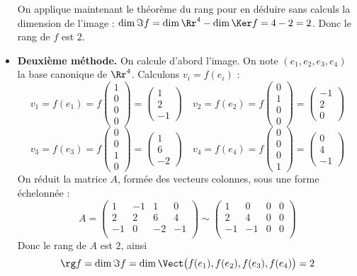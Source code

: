 \documentclass[class=report,crop=false]{standalone}
\begin{document}
\begin{exemple}
\begin{itemize}
  On applique maintenant le théorème du rang pour en déduire sans calculs la dimension de l'image :
  $\dim \Im f = \dim \Rr^4 - \dim \Ker f = 4-2 = 2$.
  Donc le rang de $f$ est $2$.

  \item \textbf{Deuxième méthode.} On calcule d'abord l'image.
  On note $(e_1,e_2,e_3,e_4)$ la base canonique de $\Rr^4$.
Calculons $v_i = f(e_i)$ :
$$v_1 = f(e_1) = f\left(\begin{smallmatrix} 1 \\ 0 \\ 0 \\0 \end{smallmatrix}\right)
= \left(\begin{smallmatrix} 1 \\ 2 \\ -1 \end{smallmatrix}\right) \quad
v_2 = f(e_2) = f\left(\begin{smallmatrix} 0 \\ 1 \\ 0 \\ 0\end{smallmatrix}\right)
= \left(\begin{smallmatrix} -1 \\ 2 \\ 0 \end{smallmatrix}\right)$$
$$
v_3 = f(e_3) = f\left(\begin{smallmatrix} 0 \\ 0 \\ 1 \\  0\end{smallmatrix}\right)
= \left(\begin{smallmatrix} 1 \\ 6 \\ -2 \end{smallmatrix}\right) \quad
v_4 = f(e_4) = f\left(\begin{smallmatrix} 0 \\ 0 \\ 0 \\1 \end{smallmatrix}\right)
= \left(\begin{smallmatrix} 0 \\ 4 \\ -1 \end{smallmatrix}\right)
$$
On réduit la matrice $A$, formée des vecteurs colonnes, sous une forme échelonnée :
$$A = \begin{pmatrix}
    1&-1&1&0\\
    2&2&6&4\\
    -1&0&-2&-1\\
  \end{pmatrix}
  \sim
  \begin{pmatrix}
    1&0&0&0\\
    2&4&0&0\\
    -1&-1&0&0\\
  \end{pmatrix}$$
Donc le rang de $A$ est $2$, ainsi 
$$\rg f = \dim \Im f
= \dim \Vect\big( f(e_1),f(e_2),f(e_3),f(e_4) \big) = 2$$


\end{itemize}
\end{exemple}
\end{document}
